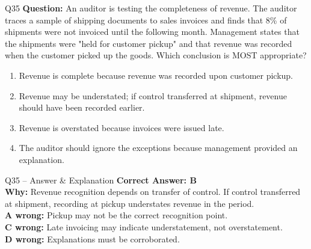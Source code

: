 \documentclass[aspectratio=169,10pt]{beamer}
\begin{document}
	\begin{frame}[t]{Q35}
		\small
		\textbf{Question:} An auditor is testing the completeness of revenue. The auditor traces a sample of shipping documents to sales invoices and finds that 8\% of shipments were not invoiced until the following month. Management states that the shipments were "held for customer pickup" and that revenue was recorded when the customer picked up the goods. Which conclusion is MOST appropriate?
		\begin{enumerate}[label=\Alph*.,itemsep=1pt,topsep=2pt]
			\item Revenue is complete because revenue was recorded upon customer pickup.
			\item Revenue may be understated; if control transferred at shipment, revenue should have been recorded earlier.
			\item Revenue is overstated because invoices were issued late.
			\item The auditor should ignore the exceptions because management provided an explanation.
		\end{enumerate}
	\end{frame}
	
	\begin{frame}[t]{Q35 -- Answer \& Explanation}
		\small
		\textbf{Correct Answer: B} \\[4pt]
		\textbf{Why:} Revenue recognition depends on transfer of control. If control transferred at shipment, recording at pickup understates revenue in the period. \\[4pt]
		\textbf{A wrong:} Pickup may not be the correct recognition point. \\[2pt]
		\textbf{C wrong:} Late invoicing may indicate understatement, not overstatement. \\[2pt]
		\textbf{D wrong:} Explanations must be corroborated.
	\end{frame}
	
\end{document}
